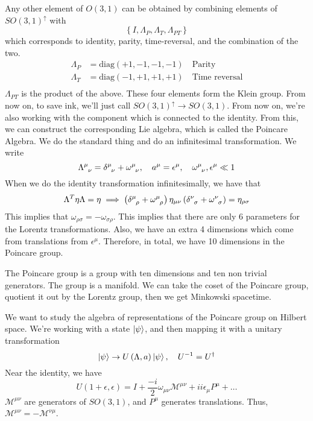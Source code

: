 \documentclass[11pt, oneside]{article}   	%
\theoremstyle{slanted}
\begin{document}
Any other element of $ O \left( 3, 1  \right)  $ 
can be obtained by combining elements of 
$ SO ( 3 , 1 ) ^{ \uparrow } $ with 
\[
\left\{  I , \Lambda _ P , \Lambda _ T , \Lambda _{ PT }  \right\}  
\] which corresponds to identity, parity, time-reversal, 
and the combination of the two. 
\begin{align*}
\Lambda_ P &  = \text{diag}\left( + 1, -1 , -1, -1  \right) \quad \text{Parity} \\
\Lambda _ T &=  \text{diag} \left( -1, +1, + 1, + 1  \right)  \quad \text{Time reversal} \\
\end{align*} 
$ \Lambda_{ PT}$ is the product of the above. 
These four elements form the Klein group. 
From now on, to save ink, we'll just call $ SO ( 3, 1 ) ^{ \uparrow } \to SO ( 3, 1 ) $. 
From now on, we're also working with the component 
which is connected to the identity. 
From this, we can construct the corresponding Lie algebra, 
which is called the Poincare Algebra. 
We do the standard thing and do an infinitesimal 
transformation. 
We write 
\[
\Lambda \indices{ ^ \mu _ \nu }  = \delta \indices{ ^ \mu _ \nu  } + 
\omega \indices{ ^ \mu _ \nu } , \quad a ^ \mu  = \epsilon ^ \mu , \quad 
\omega \indices{ ^ \mu _ \nu } , \epsilon ^ \mu \ll 1  
\] When we do the identity transformation 
infinitesimally, we have that 
\[
\Lambda ^  T \eta \Lambda  = \eta \implies \left( 
\delta \indices{ ^ \mu _ \rho } + \omega \indices{ ^ \mu _ \rho }   \right)  
\eta _{ \mu \nu } \left( \delta \indices{ ^ \nu _ \sigma } + 
\omega \indices{ ^ \nu _ \sigma }  \right)   = \eta _{ \rho \sigma }
\] This implies that $ \omega _{ \rho \sigma }  =  - \omega _{ \sigma \rho  } $. 
This implies that there are only $ 6 $ parameters for the Lorentz 
transformations. Also, we have an extra 4 dimensions 
which come from translations from $ \epsilon ^ \mu $. 
Therefore, in total, we have 10 dimensions in the Poincare group. 

The Poincare group is a group with ten dimensions and 
ten non trivial generators. 
The group is a manifold. We can take the coset of the Poincare group, 
quotient it out by the Lorentz group, then we get 
Minkowski spacetime. 

We want to study the algebra of 
representations of the Poincare group on Hilbert space. 
We're working with a state $ \ket{ \psi } $, 
and then mapping it with a unitary transformation 
\[
\ket{ \psi } \to U \left( \Lambda , a  \right)  \ket{ \psi } , \quad 
U ^{ -1 }  = U ^{ \dagger }
\] Near the identity, we have 
\[
U \left( 1 + \epsilon , \epsilon  \right)  = I + \frac{ - i }{ 2 } \omega_{\mu \nu } \mathcal{ M } ^{ \mu \nu } + i i \epsilon _ \mu P ^ \mu + \dots  
\] $\mathcal{ M }^{ \mu \nu } $ 
are generators of $ SO ( 3,1 ) $, and $ P ^ \mu $ 
generates translations. Thus, $ \mathcal{ M } ^{ \mu \nu }  =  - \mathcal{ M } ^{ \nu \mu } $. 
\end{document}
